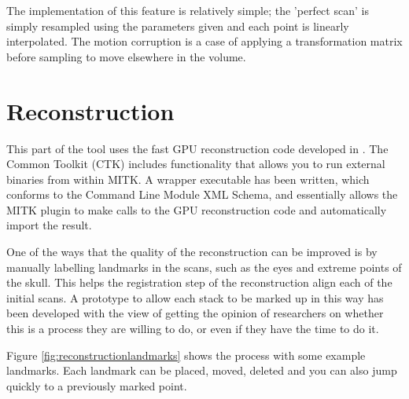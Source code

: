 The implementation of this feature is relatively simple; the 'perfect scan' is simply resampled using the parameters given and each point is linearly interpolated. The motion corruption is a case of applying a transformation matrix before sampling to move elsewhere in the volume.

\newpage
\section{Reconstruction}\label{section:reconstruction}
This part of the tool uses the fast GPU reconstruction code developed in \cite{uncertaintysvd}. The Common Toolkit (CTK) includes functionality that allows you to run external binaries from within MITK\cite{ctkcmd}. A wrapper executable has been written, which conforms to the Command Line Module XML Schema, and essentially allows the MITK plugin to make calls to the GPU reconstruction code and automatically import the result.

One of the ways that the quality of the reconstruction can be improved is by manually labelling landmarks in the scans, such as the eyes and extreme points of the skull. This helps the registration step of the reconstruction align each of the initial scans. A prototype to allow each stack to be marked up in this way has been developed with the view of getting the opinion of researchers on whether this is a process they are willing to do, or even if they have the time to do it.

Figure \ref{fig:reconstructionlandmarks} shows the process with some example landmarks. Each landmark can be placed, moved, deleted and you can also jump quickly to a previously marked point.

